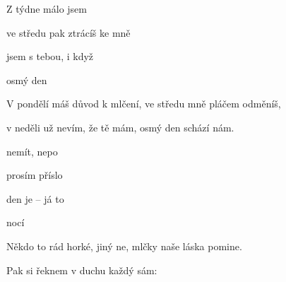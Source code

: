 

\zs
Z  týdne málo jsem   

ve středu pak ztrácíš ke mně 

 jsem s tebou, i když 

osmý den    
\ks

\zs
V pondělí máš důvod k mlčení, ve středu mně pláčem odměníš,

v neděli už nevím, že tě mám, osmý den schází nám.
\ks

\zr
{} nemít,  nepo

 prosím  příslo

 den je  -- já to 

 nocí    
\kr

\zs
Někdo to rád horké, jiný ne, mlčky naše láska pomine.

Pak si řeknem v duchu každý sám: 
\ks

\zr\kr

\kp
